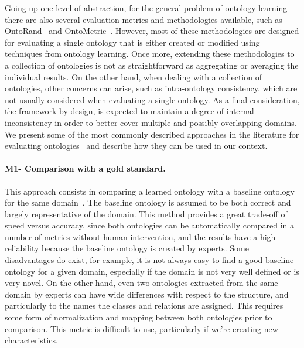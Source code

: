 	Going up one level of abstraction, for the general problem of ontology learning there are also
    several evaluation metrics and methodologies available, such as OntoRand~\cite{ontorand}
    and OntoMetric~\cite{ontometric}. However, most of these
    methodologies are designed for evaluating a single ontology that is either created or
    modified using techniques from ontology learning. Once more, extending these methodologies
    to a collection of ontologies is not as straightforward as aggregating or averaging
    the individual results. On the other hand, when dealing with a collection of ontologies,
    other concerns can arise, such as intra-ontology consistency, which are not usually
    considered when evaluating a single ontology. As a final consideration, the framework
    by design, is expected to maintain a degree of internal inconsistency in order
    to better cover multiple and possibly overlapping domains.
    We present some of the most commonly described approaches in the literature for
    evaluating ontologies~\cite{petasis2011ontology}
    and describe how they can be used in our context.

    \paragraph{M1- Comparison with a gold standard.}
	This approach consists in comparing a learned ontology with a baseline ontology
    for the same domain~\cite{corcoglioniti2016frame}. The baseline ontology is
    assumed to be both correct and largely representative of the domain. This method
    provides a great trade-off of speed versus accuracy, since both ontologies
    can be automatically compared in a number of metrics without human intervention,
    and the results have a high reliability because the baseline ontology is created
    by experts. Some disadvantages do exist, for example, it is not always easy to
    find a good baseline ontology for a given domain, especially if the domain is
    not very well defined or is very novel. On the other hand, even two ontologies
    extracted from the same domain by experts can have wide differences with respect to
    the structure, and particularly to the names the classes and relations are
    assigned. This requires some form of normalization and mapping between both ontologies
    prior to comparison. This metric is difficult to use, particularly if
    we're creating new characteristics.

